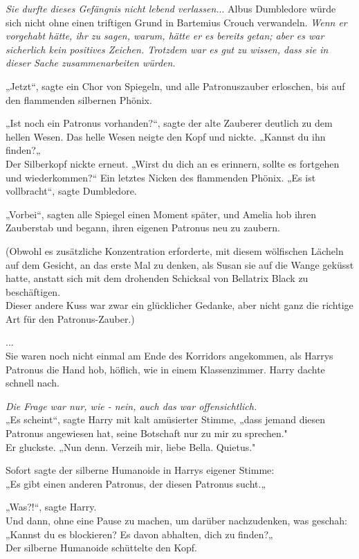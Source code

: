 {\emph{Sie durfte dieses Gefängnis nicht lebend verlassen.}.. Albus Dumbledore würde sich nicht ohne einen triftigen Grund in Bartemius Crouch verwandeln. \emph{Wenn er vorgehabt hätte, ihr zu sagen, warum, hätte er es bereits getan; aber es war sicherlich kein positives Zeichen. Trotzdem war es gut zu wissen, dass sie in dieser Sache zusammenarbeiten würden.}

„Jetzt“, sagte ein Chor von Spiegeln, und alle Patronuszauber erloschen, bis auf den flammenden silbernen Phönix.

„Ist noch ein Patronus vorhanden?“, sagte der alte Zauberer deutlich zu dem hellen Wesen. Das helle Wesen neigte den Kopf und nickte. „Kannst du ihn finden?„\\ Der Silberkopf nickte erneut. „Wirst du dich an es erinnern, sollte es fortgehen und wiederkommen?“ Ein letztes Nicken des flammenden Phönix. „Es ist vollbracht“, sagte Dumbledore.

„Vorbei“, sagten alle Spiegel einen Moment später, und Amelia hob ihren Zauberstab und begann, ihren eigenen Patronus neu zu zaubern.

(Obwohl es zusätzliche Konzentration erforderte, mit diesem wölfischen Lächeln auf dem Gesicht, an das erste Mal zu denken, als Susan sie auf die Wange geküsst hatte, anstatt sich mit dem drohenden Schicksal von Bellatrix Black zu beschäftigen.\\ Dieser andere Kuss war zwar ein glücklicher Gedanke, aber nicht ganz die richtige Art für den Patronus-Zauber.)

...\\ Sie waren noch nicht einmal am Ende des Korridors angekommen, als Harrys Patronus die Hand hob, höflich, wie in einem Klassenzimmer. Harry dachte schnell nach.

\emph{Die Frage war nur, wie - nein, auch das war offensichtlich.}\\ „Es scheint“, sagte Harry mit kalt amüsierter Stimme, „dass jemand diesen Patronus angewiesen hat, seine Botschaft nur zu mir zu sprechen."\\ Er gluckste. „Nun denn. Verzeih mir, liebe Bella. Quietus."

Sofort sagte der silberne Humanoide in Harrys eigener Stimme:\\ „Es gibt einen anderen Patronus, der diesen Patronus sucht.„

„Was?!“, sagte Harry.\\ Und dann, ohne eine Pause zu machen, um darüber nachzudenken, was geschah:\\ „Kannst du es blockieren? Es davon abhalten, dich zu finden?„\\ Der silberne Humanoide schüttelte den Kopf.

}
